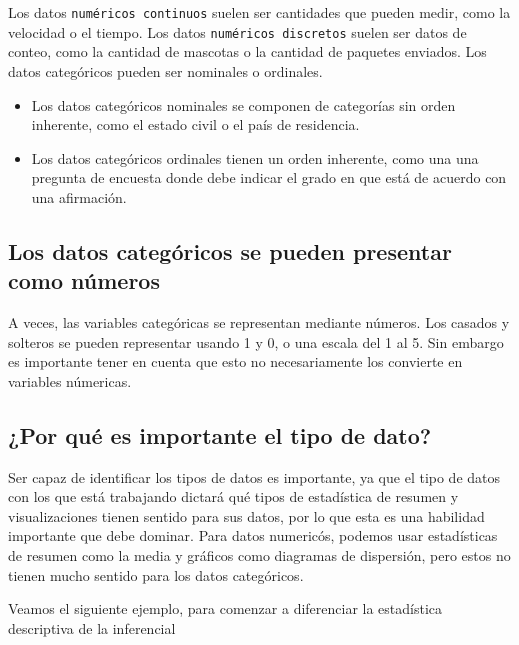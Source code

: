 \documentclass[
  letterpaper,
  DIV=11,
  numbers=noendperiod]{scrreprt}
\begin{document}
Los datos \texttt{numéricos\ continuos} suelen ser cantidades que pueden
medir, como la velocidad o el tiempo. Los datos
\texttt{numéricos\ discretos} suelen ser datos de conteo, como la
cantidad de mascotas o la cantidad de paquetes enviados. Los datos
categóricos pueden ser nominales o ordinales.

\begin{itemize}
\item
  Los datos categóricos nominales se componen de categorías sin orden
  inherente, como el estado civil o el país de residencia.
\item
  Los datos categóricos ordinales tienen un orden inherente, como una
  una pregunta de encuesta donde debe indicar el grado en que está de
  acuerdo con una afirmación.
\end{itemize}

\hypertarget{los-datos-categuxf3ricos-se-pueden-presentar-como-nuxfameros}{%
\subsection{Los datos categóricos se pueden presentar como
números}\label{los-datos-categuxf3ricos-se-pueden-presentar-como-nuxfameros}}

A veces, las variables categóricas se representan mediante números. Los
casados y solteros se pueden representar usando 1 y 0, o una escala del
1 al 5. Sin embargo es importante tener en cuenta que esto no
necesariamente los convierte en variables númericas.

\hypertarget{por-quuxe9-es-importante-el-tipo-de-dato}{%
\subsection{¿Por qué es importante el tipo de
dato?}\label{por-quuxe9-es-importante-el-tipo-de-dato}}

Ser capaz de identificar los tipos de datos es importante, ya que el
tipo de datos con los que está trabajando dictará qué tipos de
estadística de resumen y visualizaciones tienen sentido para sus datos,
por lo que esta es una habilidad importante que debe dominar. Para datos
numericós, podemos usar estadísticas de resumen como la media y gráficos
como diagramas de dispersión, pero estos no tienen mucho sentido para
los datos categóricos.

Veamos el siguiente ejemplo, para comenzar a diferenciar la estadística
descriptiva de la inferencial
\end{document}
